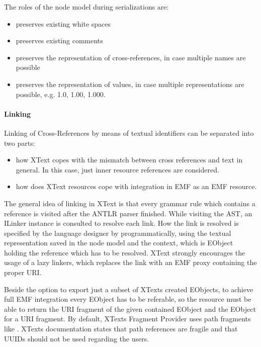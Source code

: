 The roles of the node model during serializations are:
\begin{itemize}
	\item preserves existing white spaces
	\item preserves existing comments
	\item preserves the representation of cross-references, in case multiple names are possible
	\item preserves the representation of values, in case multiple representations are possible, e.g. 1.0, 1.00, 1.000.
\end{itemize}

\paragraph{Linking}
\label{sec:xtextarch:Linking}
Linking of Cross-References by means of textual identifiers can be separated into two parts:
\begin{itemize}
	\item how XText copes with the mismatch between cross references and text in general. In this case, just inner resource references are considered. 
	\item how does XText resources cope with integration in EMF as an EMF resource.
\end{itemize}
The general idea of linking in XText is that every grammar rule which contains a reference is visited after the ANTLR parser  finished. While visiting the AST, an ILinker instance is consulted to resolve each link. How the link is resolved is specified by the language designer by programmatically, using the textual representation saved in the node model and the context, which is EObject holding the reference which has to be resolved. XText strongly encourages the usage of a lazy linkers, which replaces the link with an EMF proxy containing the proper URI.

Beside the option to export just a subset of XTexts created EObjects, to achieve full EMF integration every EObject has to be referable, so the resource must be able to return the URI fragment of the given contained EObject and the EObject for a URI fragment. By default, XTexts Fragment Provider  uses path fragments like . XTexts documentation states that path references are fragile and that UUIDs should not be used regarding the users. 

